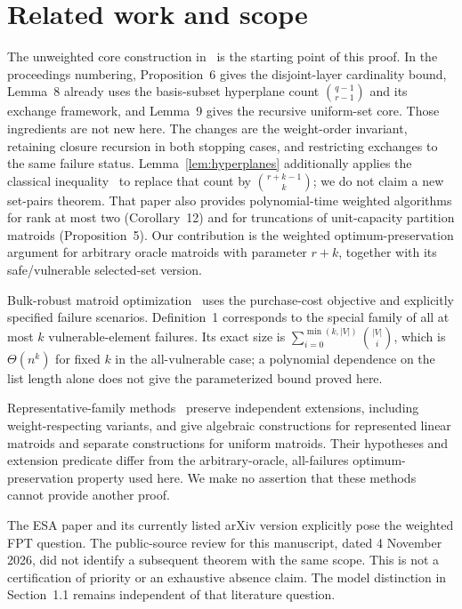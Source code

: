 \documentclass[11pt]{article}
\theoremstyle{definition}\newtheorem{definition}[theorem]{Definition}
\theoremstyle{remark}\newtheorem{remark}[theorem]{Remark}
\begin{document}
\section{Related work and scope}
The unweighted core construction in~\cite{BFGL} is the starting point of this proof. In the proceedings numbering, Proposition~6 gives the disjoint-layer cardinality bound, Lemma~8 already uses the basis-subset hyperplane count $\binom{q-1}{r-1}$ and its exchange framework, and Lemma~9 gives the recursive uniform-set core. Those ingredients are not new here. The changes are the weight-order invariant, retaining closure recursion in both stopping cases, and restricting exchanges to the same failure status. Lemma~\ref{lem:hyperplanes} additionally applies the classical inequality~\cite{Bollobas} to replace that count by $\binom{r+k-1}{k}$; we do not claim a new set-pairs theorem. That paper also provides polynomial-time weighted algorithms for rank at most two (Corollary~12) and for truncations of unit-capacity partition matroids (Proposition~5). Our contribution is the weighted optimum-preservation argument for arbitrary oracle matroids with parameter $r+k$, together with its safe/vulnerable selected-set version.

Bulk-robust matroid optimization~\cite{ASZ} uses the purchase-cost objective and explicitly specified failure scenarios. Definition~1 corresponds to the special family of all at most $k$ vulnerable-element failures. Its exact size is $\sum_{i=0}^{\min(k,|V|)}\binom{|V|}{i}$, which is $\Theta(n^k)$ for fixed $k$ in the all-vulnerable case; a polynomial dependence on the list length alone does not give the parameterized bound proved here.

Representative-family methods~\cite{FLPS} preserve independent extensions, including weight-respecting variants, and give algebraic constructions for represented linear matroids and separate constructions for uniform matroids. Their hypotheses and extension predicate differ from the arbitrary-oracle, all-failures optimum-preservation property used here. We make no assertion that these methods cannot provide another proof.

The ESA paper and its currently listed arXiv version explicitly pose the weighted FPT question. The public-source review for this manuscript, dated 4 November 2026, did not identify a subsequent theorem with the same scope. This is not a certification of priority or an exhaustive absence claim. The model distinction in Section~1.1 remains independent of that literature question.
\end{document}
